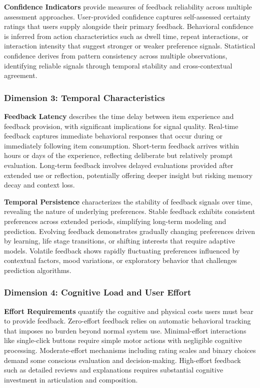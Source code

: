 \textbf{Confidence Indicators} provide measures of feedback reliability across multiple assessment approaches. User-provided confidence captures self-assessed certainty ratings that users supply alongside their primary feedback. Behavioral confidence is inferred from action characteristics such as dwell time, repeat interactions, or interaction intensity that suggest stronger or weaker preference signals. Statistical confidence derives from pattern consistency across multiple observations, identifying reliable signals through temporal stability and cross-contextual agreement.

\subsubsection{Dimension 3: Temporal Characteristics}

\textbf{Feedback Latency} describes the time delay between item experience and feedback provision, with significant implications for signal quality. Real-time feedback captures immediate behavioral responses that occur during or immediately following item consumption. Short-term feedback arrives within hours or days of the experience, reflecting deliberate but relatively prompt evaluation. Long-term feedback involves delayed evaluations provided after extended use or reflection, potentially offering deeper insight but risking memory decay and context loss.

\textbf{Temporal Persistence} characterizes the stability of feedback signals over time, revealing the nature of underlying preferences. Stable feedback exhibits consistent preferences across extended periods, simplifying long-term modeling and prediction. Evolving feedback demonstrates gradually changing preferences driven by learning, life stage transitions, or shifting interests that require adaptive models. Volatile feedback shows rapidly fluctuating preferences influenced by contextual factors, mood variations, or exploratory behavior that challenges prediction algorithms.

\subsubsection{Dimension 4: Cognitive Load and User Effort}

\textbf{Effort Requirements} quantify the cognitive and physical costs users must bear to provide feedback. Zero-effort feedback relies on automatic behavioral tracking that imposes no burden beyond normal system use. Minimal-effort interactions like single-click buttons require simple motor actions with negligible cognitive processing. Moderate-effort mechanisms including rating scales and binary choices demand some conscious evaluation and decision-making. High-effort feedback such as detailed reviews and explanations requires substantial cognitive investment in articulation and composition.

